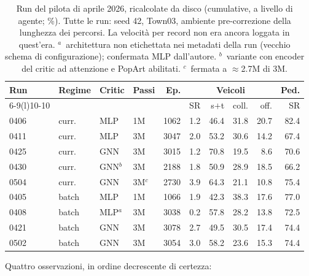 \begin{table}[t]
  \centering\small
  \caption{Run del pilota di aprile 2026, ricalcolate da disco
  (cumulative, a livello di agente; \%). Tutte le run: seed 42, Town03,
  ambiente pre-correzione della lunghezza dei percorsi. La velocità per
  record non era ancora loggata in quest'era. $^{a}$~architettura non
  etichettata nei metadati della run (vecchio schema di configurazione);
  confermata MLP dall'autore. $^{b}$~variante con encoder del critic ad
  attenzione e PopArt abilitati. $^{c}$~fermata a $\approx$2.7M di 3M.}
  \label{tab:pilot}
  \begin{tabular}{@{}llllrrrrrr@{}}
    \toprule
    Run & Regime & Critic & Passi & Ep. & \multicolumn{4}{c}{Veicoli} & Ped. \\
    \cmidrule(lr){6-9}\cmidrule(l){10-10}
    & & & & & SR & s$+$t & coll. & off. & SR \\
    \midrule
    0406 & curr.\ & MLP & 1M & 1062 & 1.2 & 46.4 & 31.8 & 20.7 & 82.4 \\
    0411 & curr.\ & MLP & 3M & 3047 & 2.0 & 53.2 & 30.6 & 14.2 & 67.4 \\
    0425 & curr.\ & GNN & 3M & 3015 & 1.2 & 70.8 & 19.5 & 8.6 & 70.6 \\
    0430 & curr.\ & GNN$^{b}$ & 3M & 2188 & 1.8 & 50.9 & 28.9 & 18.5 & 66.2 \\
    0504 & curr.\ & GNN & 3M$^{c}$ & 2730 & 3.9 & 64.3 & 21.1 & 10.8 & 75.4 \\
    0405 & batch & MLP & 1M & 1066 & 1.9 & 42.3 & 38.3 & 17.6 & 77.0 \\
    0408 & batch & MLP$^{a}$ & 3M & 3038 & 0.2 & 57.8 & 28.2 & 13.8 & 72.5 \\
    0421 & batch & GNN & 3M & 3078 & 2.7 & 49.5 & 30.5 & 17.4 & 74.4 \\
    0502 & batch & GNN & 3M & 3054 & 3.0 & 58.2 & 23.6 & 15.3 & 74.4 \\
    \bottomrule
  \end{tabular}
\end{table}

Quattro osservazioni, in ordine decrescente di certezza:

